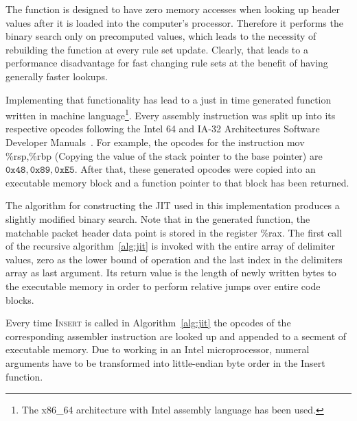 \documentclass[a4paper,
		12pt,
		parskip=full,
		titlepage
		]{scrartcl}
\begin{document}
The function is designed to have zero memory accesses when looking up header 
values after it is loaded into the computer's processor.
Therefore it performs the binary search only on precomputed values, which 
leads to the necessity of rebuilding the function at every rule set update.
Clearly, that leads to a performance disadvantage for fast changing rule sets at the benefit of having generally faster lookups.

Implementing that functionality has lead to a just in time generated function written in machine 
language\footnote{The x86\_64 architecture with Intel assembly language has been used.}.
Every assembly instruction was split up into its respective opcodes following the 
Intel 64 and IA-32 Architectures Software Developer Manuals~\cite{intelsys}.
For example, the opcodes for the instruction 
\textsf{mov \%rsp,\%rbp} (Copying the value of the stack pointer to the base pointer) 
are $\texttt{0x48}, \texttt{0x89}, \texttt{0xE5}$.
After that, these generated opcodes were copied into an executable memory block and a function pointer to that block has been returned.

The algorithm for constructing the JIT used in this implementation produces a slightly modified binary search.
Note that in the generated function, the matchable packet header data point is stored in the register \textsf{\%rax}.
The first call of the recursive algorithm~\ref{alg:jit} is invoked with the entire array of delimiter values,
zero as the lower bound of operation and the last index in the delimiters array as last argument.
Its return value is the length of newly written bytes to the executable memory in order to perform relative jumps over entire code blocks.

Every time \textsc{Insert} is called in Algorithm~\ref{alg:jit} the opcodes 
of the corresponding assembler instruction are looked up and appended to a secment of executable memory.
Due to working in an Intel microprocessor, numeral arguments have to be 
transformed into little-endian byte order in the \textsf{Insert} function.
\end{document}
